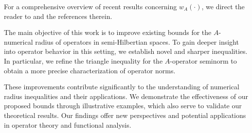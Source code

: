 \documentclass{article}
\begin{document}
For a comprehensive overview of recent results concerning $w_A(\cdot)$, we direct the reader to \cite{FagGor, BF, BFP, Feki, Feki-1, Feki-2, HFA, MXZ, QHB, QHC, Zamani-1, Zamani-2} and the references therein.

The main objective of this work is to improve existing bounds for the $A$-numerical radius of operators in semi-Hilbertian spaces. To gain deeper insight into operator behavior in this setting, we establish novel and sharper inequalities. In particular, we refine the triangle inequality for the $A$-operator seminorm to obtain a more precise characterization of operator norms.

These improvements contribute significantly to the understanding of numerical radius inequalities and their applications. We demonstrate the effectiveness of our proposed bounds through illustrative examples, which also serve to validate our theoretical results. Our findings offer new perspectives and potential applications in operator theory and functional analysis.
\end{document}
